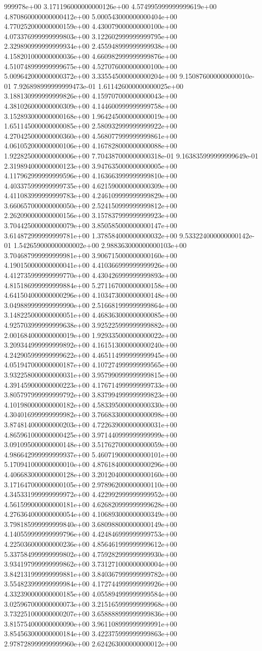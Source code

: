 999978e+00	3.171196000000000126e+00	4.574995999999999619e+00	4.870860000000000412e+00	5.000543000000000404e+00	4.770252000000000159e+00	4.430079000000000100e+00	4.073376999999999803e+00	3.122602999999999795e+00	2.329890999999999934e+00	2.455948999999999938e+00	4.158201000000000036e+00	4.660982999999999876e+00	4.510748999999999675e+00	4.527076000000000100e+00	5.009642000000000372e+00	3.335545000000000204e+00	9.150876000000000010e-01	7.926898999999999473e-01	1.611426000000000025e+00	3.188130999999999826e+00	4.159707000000000043e+00	4.381026000000000309e+00	4.144600999999999758e+00	3.152893000000000168e+00	1.964245000000000019e+00	1.651145000000000085e+00	2.580932999999999922e+00	4.270425000000000360e+00	4.568077999999999861e+00	4.061052000000000106e+00	4.167828000000000088e+00	1.922825000000000006e+00	7.704387000000000318e-01	9.163835999999999649e-01	2.319894000000000123e+00	3.947635000000000005e+00	4.117962999999999596e+00	4.163663999999999810e+00	4.403375999999999735e+00	4.621590000000000309e+00	4.411083999999999783e+00	4.246109999999999829e+00	3.660657000000000050e+00	2.524150999999999812e+00	2.262090000000000156e+00	3.157837999999999923e+00	3.704425000000000079e+00	3.850585000000000147e+00	3.614872999999999781e+00	1.378584000000000032e+00	9.533224000000000142e-01	1.542659000000000002e+00	2.988363000000000103e+00	3.704687999999999981e+00	3.906715000000000160e+00	4.190150000000000041e+00	4.410366999999999926e+00	4.412735999999999770e+00	4.430426999999999893e+00	4.815186999999999884e+00	5.271167000000000158e+00	4.641504000000000296e+00	4.103473000000000148e+00	3.049889999999999990e+00	2.516681999999999864e+00	3.148225000000000051e+00	4.468363000000000085e+00	4.925703999999999638e+00	3.925225999999999882e+00	2.001684000000000019e+00	1.929335000000000022e+00	3.209344999999999892e+00	4.161513000000000240e+00	4.242905999999999622e+00	4.465114999999999945e+00	4.051947000000000187e+00	4.107274999999999565e+00	3.932258000000000031e+00	3.957990999999999815e+00	4.391459000000000223e+00	4.176714999999999733e+00	3.805797999999999792e+00	3.837994999999999823e+00	4.101980000000000182e+00	4.583395000000000330e+00	4.304016999999999982e+00	3.766833000000000098e+00	3.874814000000000203e+00	4.722639000000000031e+00	4.865961000000000425e+00	3.971440999999999999e+00	3.091095000000000148e+00	3.517627000000000059e+00	4.986642999999999937e+00	5.460719000000000101e+00	5.170941000000000010e+00	4.876184000000000296e+00	4.406683000000000128e+00	3.201204000000000160e+00	3.171647000000000105e+00	2.978962000000000110e+00	4.345331999999999972e+00	4.422992999999999952e+00	4.561599000000000181e+00	4.626820999999999628e+00	4.276364000000000054e+00	4.106893000000000349e+00	3.798185999999999840e+00	3.680988000000000149e+00	4.140559999999999796e+00	4.424846999999999753e+00	4.225036000000000236e+00	4.856461999999999612e+00	5.337584999999999802e+00	4.759282999999999930e+00	3.934197999999999862e+00	3.731271000000000004e+00	3.842131999999999881e+00	3.840367999999999782e+00	3.554823999999999984e+00	4.172744999999999926e+00	4.332390000000000185e+00	4.055894999999999584e+00	3.025967000000000073e+00	3.215165999999999968e+00	3.732251000000000207e+00	3.658888999999999836e+00	3.815754000000000090e+00	3.961108999999999991e+00	3.854563000000000184e+00	3.422375999999999863e+00	2.978728999999999960e+00	2.624263000000000012e+00	
